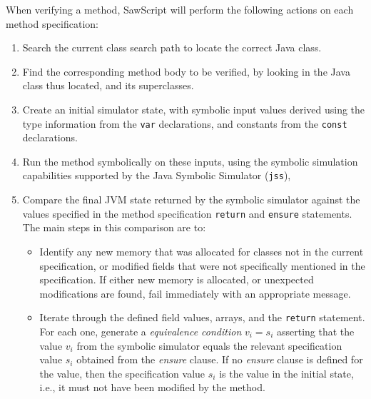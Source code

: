 \documentclass[12pt]{galois-whitepaper}
\newcommand{\sawScript}{{\sc SawScript}\xspace}
\begin{document}
When verifying a method, \sawScript will perform the following actions on each method specification:

\begin{enumerate}

\item Search the current class search path to locate the correct Java class.

\item Find the corresponding method body to be verified, by looking in the
        Java class thus located, and its superclasses.

\item Create an initial simulator state, with symbolic input values derived
        using the type information from the {\tt var} declarations, and
        constants from the {\tt const} declarations.  
        \label{enum:simulator}

\item Run the method symbolically on these inputs, using the symbolic
        simulation capabilities supported by the Java Symbolic Simulator
        ({\tt{}jss}),

\item Compare the final JVM state returned by the symbolic simulator against
        the values specified in the method specification {\tt return} and
        {\tt ensure} statements.  The main steps in this comparison are to:
        
 \begin{itemize}

   \item Identify any new memory that was allocated for classes not in the current
           specification, or modified fields that were not specifically
           mentioned in the specification.  If either new memory is allocated, or unexpected
           modifications are found, fail immediately with an appropriate message.

   \item Iterate through the defined field values, arrays, and the {\tt return} statement.
           For each one, generate a \emph{equivalence condition} $v_i = s_i$ asserting
           that the value $v_i$ from the symbolic simulator equals the relevant
           specification value $s_i$ obtained from the \emph{ensure} clause.
           If no \emph{ensure} clause is defined for the value, then
           the specification value $s_i$ is the value in the initial state, i.e., it must
           not have been modified by the method.


\end{itemize}
\end{enumerate}
\end{document}

